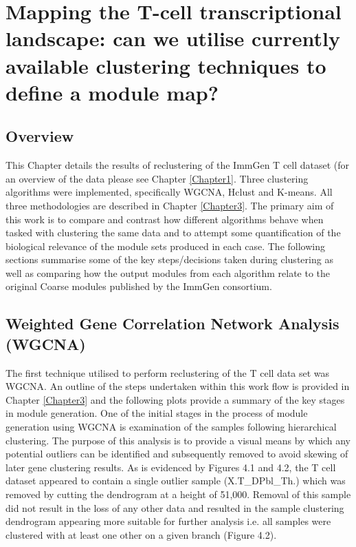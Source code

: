 
\chapter{Mapping the T-cell transcriptional landscape: can we utilise  currently available clustering techniques  to define a module map?} %

\label{Chapter4} %

\section{Overview}

This Chapter details the results of reclustering of the ImmGen T cell dataset (for an overview of the data please see Chapter \ref{Chapter1}. Three clustering algorithms were implemented, specifically WGCNA, Hclust and K-means. All three methodologies are described in Chapter \ref{Chapter3}. The primary aim of this work is to compare and contrast how different algorithms behave when tasked with clustering the same data and to attempt some quantification of the biological relevance of the module sets produced in each case. The following sections summarise some of the key steps/decisions taken during clustering as well as comparing how the output modules from each algorithm relate to the original Coarse modules published by the ImmGen consortium. 

\section{Weighted Gene Correlation Network Analysis (WGCNA)}

The first technique utilised to perform reclustering of the T cell data set was WGCNA. An outline of the steps undertaken within this work flow is provided in Chapter \ref{Chapter3} and the following plots provide a summary of the key stages in module generation. One of the initial stages in the process of module generation using WGCNA is examination of the samples following hierarchical clustering. The purpose of this analysis is to provide a visual means by which any potential outliers can be identified and subsequently removed to avoid skewing of later gene clustering results. As is evidenced by Figures 4.1 and 4.2, the T cell dataset appeared to contain a single outlier sample (X.T\_DPbl\_Th.) which was removed by cutting the dendrogram at a height of 51,000. Removal of this sample did not result in the loss of any other data and resulted in the sample clustering dendrogram appearing more suitable for further analysis i.e. all samples were clustered with at least one other on a given branch (Figure 4.2). 

